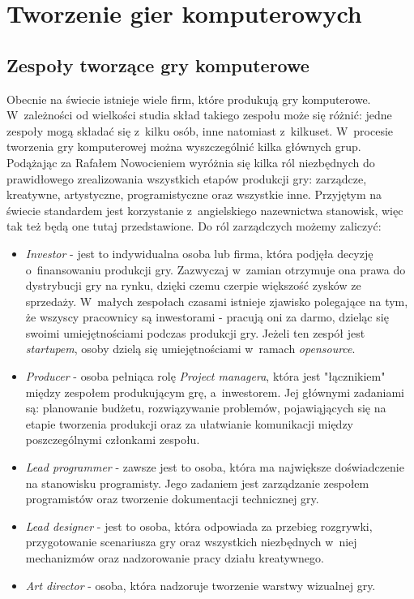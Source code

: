 \documentclass[12pt,a4paper,oneside]{book}
\theoremstyle{definition}
\numberwithin{equation}{chapter}
\begin{document}
\section{Tworzenie gier komputerowych}
\subsection{Zespoły tworzące gry komputerowe}
Obecnie na świecie istnieje wiele firm, które produkują gry komputerowe. W~zależności od wielkości studia skład takiego zespołu może się różnić: jedne zespoły mogą składać się z~kilku osób, inne natomiast z~kilkuset. W~procesie tworzenia gry komputerowej można wyszczególnić kilka głównych grup. Podążając za  Rafałem Nowocieniem \cite{KompendiumProd} wyróżnia się kilka ról niezbędnych do prawidłowego zrealizowania wszystkich etapów produkcji gry: zarządcze, kreatywne, artystyczne, programistyczne oraz wszystkie inne. Przyjętym na świecie standardem jest korzystanie z~angielskiego nazewnictwa stanowisk, więc tak też będą one tutaj przedstawione. Do ról zarządczych możemy zaliczyć:
\begin{itemize}
    \item \textit{Investor} - jest to indywidualna osoba lub firma, która podjęła decyzję o~finansowaniu produkcji gry. Zazwyczaj w~zamian otrzymuje ona prawa do dystrybucji gry na rynku, dzięki czemu czerpie większość zysków ze sprzedaży. W~małych zespołach czasami istnieje zjawisko polegające na tym, że wszyscy pracownicy są inwestorami - pracują oni za darmo, dzieląc się swoimi umiejętnościami podczas produkcji gry. Jeżeli ten zespół jest \textit{startupem}, osoby dzielą się umiejętnościami w~ramach \textit{opensource}.
    \item \textit{Producer} - osoba pełniąca rolę \textit{Project managera}, która jest "łącznikiem" między zespołem produkującym grę, a~inwestorem. Jej głównymi zadaniami są: planowanie budżetu, rozwiązywanie problemów, pojawiąjących się na etapie tworzenia produkcji oraz za ułatwianie komunikacji między poszczególnymi członkami zespołu.
    \item \textit{Lead programmer} - zawsze jest to osoba, która ma największe doświadczenie na stanowisku programisty. Jego zadaniem jest zarządzanie zespołem programistów oraz tworzenie dokumentacji technicznej gry.
    \item \textit{Lead designer} - jest to osoba, która odpowiada za przebieg rozgrywki, przygotowanie scenariusza gry oraz wszystkich niezbędnych w~niej mechanizmów oraz nadzorowanie pracy działu kreatywnego.
    \item \textit{Art director} - osoba, która nadzoruje tworzenie warstwy wizualnej gry.
\end{itemize}
\end{document}
